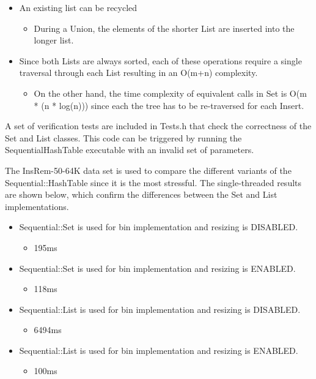 \documentclass[11pt]{article} %
\begin{document}
\begin{itemize}
	\item An existing list can be recycled
	\begin{itemize}
		\item During a Union, the elements of the shorter List are inserted into the longer list.
	\end{itemize}
	\item Since both Lists are always sorted, each of these operations require a single traversal through each List resulting in an O(m+n) complexity.
	\begin{itemize}
		\item On the other hand, the time complexity of equivalent calls in Set is O(m * (n * log(n))) since each the tree has to be re-traversed for each Insert.
	\end{itemize}
\end{itemize}

A set of verification tests are included in Tests.h that check the correctness of the Set and List classes. This code can be triggered by running the SequentialHashTable executable with an invalid set of parameters.

The InsRem-50-64K data set is used to compare the different variants of the Sequential::HashTable since it is the most stressful. The single-threaded results are shown below, which confirm the differences between the Set and List implementations.

\begin{itemize}
	\item Sequential::Set is used for bin implementation and resizing is DISABLED.
	\begin{itemize}
    		\item 195ms
	\end{itemize}
	\item Sequential::Set is used for bin implementation and resizing is ENABLED.
	\begin{itemize}
		\item 118ms
	\end{itemize}
	\item Sequential::List is used for bin implementation and resizing is DISABLED.
	\begin{itemize}
		\item 6494ms
	\end{itemize}
	\item Sequential::List is used for bin implementation and resizing is ENABLED.
	\begin{itemize}
		\item 100ms
	\end{itemize}
\end{itemize}
\end{document}
